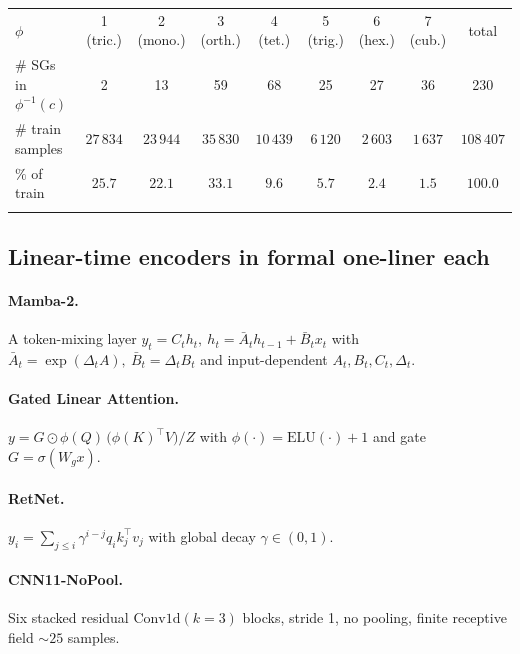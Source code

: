 \documentclass[final]{ws-ijwmip}
\begin{document}
\begin{table}[!htbp]
{\begin{tabular}{lcccccccc}
\toprule
$\phi$ & 1 (tric.) & 2 (mono.) & 3 (orth.) & 4 (tet.) & 5 (trig.) & 6 (hex.) & 7 (cub.) & total \\
\colrule
\# SGs in $\phi^{-1}(c)$ & 2 & 13 & 59 & 68 & 25 & 27 & 36 & 230 \\
\# train samples & $27\,834$ & $23\,944$ & $35\,830$ & $10\,439$ & $6\,120$ & $2\,603$ & $1\,637$ & $108\,407$ \\
$\%$ of train & $25.7$ & $22.1$ & $33.1$ & $9.6$ & $5.7$ & $2.4$ & $1.5$ & $100.0$ \\
\botrule
\end{tabular}}
\end{table}


\subsection{Linear-time encoders in formal one-liner each}

\paragraph{Mamba-2.}
A token-mixing layer
$y_t = C_t h_t,\ h_t = \bar A_t h_{t-1} + \bar B_t x_t$
with $\bar A_t = \exp(\Delta_t A),\ \bar B_t = \Delta_t B_t$ and
input-dependent $A_t, B_t, C_t, \Delta_t$.

\paragraph{Gated Linear Attention.}
$y = G \odot \phi(Q)\,\bigl(\phi(K)^\top V\bigr) / Z$ with
$\phi(\cdot) = \mathrm{ELU}(\cdot)+1$ and gate $G=\sigma(W_g x)$.

\paragraph{RetNet.}
$y_i = \sum_{j\leq i} \gamma^{i-j} q_i k_j^\top v_j$ with global decay
$\gamma\in(0,1)$.

\paragraph{CNN11-NoPool.}
Six stacked residual $\mathrm{Conv1d}(k=3)$ blocks, stride 1, no
pooling, finite receptive field $\sim 25$ samples.
\end{document}
